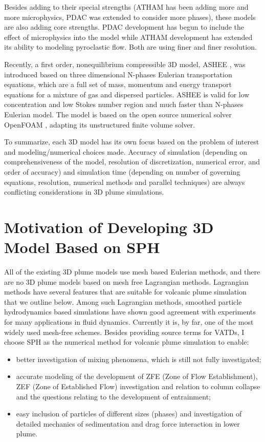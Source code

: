 Besides adding to their special strengths (ATHAM has been adding more and more microphysics, PDAC was extended to consider more phases), these models are also adding core strengths. PDAC development has begun to include the effect of microphysics into the model while ATHAM development has extended its ability to modeling pyroclastic flow. Both are using finer and finer resolution. 

Recently, a first order, nonequilibrium compressible 3D model, ASHEE \citep{cerminara2016ashee}, was introduced based on three dimensional N-phases Eulerian transportation equations, which are a full set of mass, momentum and energy transport equations for a mixture of gas and dispersed particles. ASHEE is valid for low concentration and low Stokes number region and much faster than N-phases Eulerian model. The model is based on the open source numerical solver OpenFOAM \citep{weller1998tensorial}, adapting its unstructured finite volume solver.

To summarize, each 3D model has its own focus based on the problem of interest and modeling/numerical choices made.
Accuracy of simulation (depending on comprehensiveness of the model, resolution of discretization, numerical error, and order of accuracy) and simulation time (depending on number of governing equations, resolution, numerical methods and parallel techniques) are always conflicting considerations in 3D plume simulations.

\section{Motivation of Developing 3D Model Based on SPH}

All of the existing 3D plume models use mesh based Eulerian methods, and there are no 3D plume models based on mesh free Lagrangian methods. Lagrangian methods have several features that are suitable for volcanic plume simulation that we outline below. Among such Lagrangian methods, smoothed particle hydrodynamics \citep{gingold1977smoothed,lucy1977numerical} based simulations have shown good agreement with experiments for many applications in fluid dynamics. Currently it is, by far, one of the most widely used mesh-free schemes.
Besides providing source terms for VATDs, I choose SPH as the numerical method for volcanic plume simulation to enable:
\begin{itemize}
\item better investigation of mixing phenomena, which is still not fully investigated;
\item accurate modeling of the development of ZFE (Zone of Flow Establishment), ZEF (Zone of Established Flow) investigation and relation to column collapse and the questions relating to the development of entrainment;
\item easy inclusion of particles of different sizes (phases) and investigation of detailed mechanics of sedimentation and drag force interaction in lower plume.
\end{itemize}

